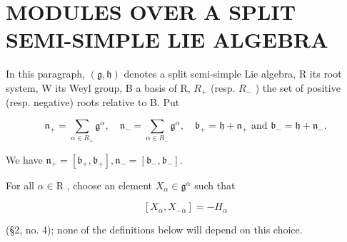 \section{MODULES OVER A SPLIT SEMI-SIMPLE LIE ALGEBRA}

In this paragraph, \((\mathfrak{g},\mathfrak{h})\) denotes a split semi-simple Lie algebra, R its root system, W its Weyl group, B a basis of R, \(R_{+}\) (resp. \(R_{-}\) ) the set of positive (resp. negative) roots relative to B. Put

\[
\mathfrak {n} _ {+} = \sum_ {\alpha \in R _ {+}} \mathfrak {g} ^ {\alpha}, \quad \mathfrak {n} _ {-} = \sum_ {\alpha \in R _ {-}} \mathfrak {g} ^ {\alpha}, \quad \mathfrak {b} _ {+} = \mathfrak {h} + \mathfrak {n} _ {+} \text {   and   } \mathfrak {b} _ {-} = \mathfrak {h} + \mathfrak {n} _ {-}.
\]

We have \(\mathfrak{n}_{+} = [\mathfrak{b}_{+},\mathfrak{b}_{+}],\mathfrak{n}_{-} = [\mathfrak{b}_{-},\mathfrak{b}_{-}].\)

For all \(\alpha\in\mathrm{R}\) , choose an element \(X_{\alpha}\in\mathfrak{g}^{\alpha}\) such that

\[
[ X _ {\alpha}, X _ {- \alpha} ] = - H _ {\alpha}
\]

(§2, no. 4); none of the definitions below will depend on this choice.

